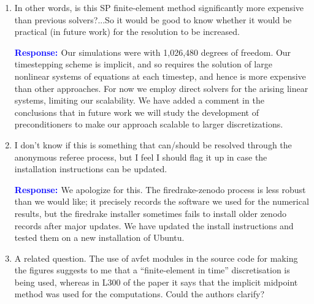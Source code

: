 \documentclass{article}
\theoremstyle{definition}
\newtheorem{remark}{Remark}[section]
\newcommand{\rv}[1]{%
  \colorbox{gray!20}{%
    \parbox{0.96\linewidth}{%
      \small #1
    }%
  }%
}
\newcommand{\rp}{\textbf{\textcolor{blue}{Response: }}}
\newcommand{\blue}[1]{\textcolor{blue}{#1}}
\begin{document}
\begin{enumerate}
\rp Fixed. Thank you so much for pointing this out. If we can choose $\bm A$ with a proper gauge $(\bm A, \bm B_H)=0$, then we can strengthen the inequality as the author pointed out. 

This is equivalent to saying that 
\begin{equation}
    |\Tilde{\mathcal{H}}|\leq C^{-1} \|\bm B_R\|^2
\end{equation}
since $\|\bm B\|^2 = \|\bm B_R\|^2 +\|\bm B_H\|^2$ due to $\bm B_R \perp \bm B_H$. We added the following content after the proof of the generalized Arnold inequality: \blue{
\begin{remark}
    If we choose $\bm A$ so that $(\bm A, \bm B_H)=0$, then we have
    \begin{equation}
        |\tilde{\mathcal{H}}|\leq C^{-1}\|\bm B_R\|^2,
    \end{equation}
    so that the harmonic form does not arise in the generalized Arnold inequality.
\end{remark}
}

\item \rv{In other words, is this SP
finite-element method significantly more expensive than previous solvers?...So it would be good to know whether it would be
practical (in future work) for the resolution to be increased.}

\rp Our simulations were with 1,026,480 degrees of freedom. Our timestepping scheme is implicit, and so requires the solution of large nonlinear systems of equations at each timestep, and hence is more expensive than other approaches. For now we employ direct solvers for the arising linear systems, limiting our scalability. We have added a comment in the conclusions that in future work we will study the development of preconditioners to make our approach scalable to larger discretizations.

\item \rv{I don’t know if this is
something that can/should be resolved through the anonymous referee process, but I feel
I should flag it up in case the installation instructions can be updated.} 

\rp We apologize for this. The firedrake-zenodo process is less robust than we would like; it precisely records the software we used for the numerical results, but the firedrake installer sometimes fails to install older zenodo records after major updates. We have updated the install instructions and tested them on a new installation of Ubuntu. 
\item \rv{A related question. The use of avfet modules in the source code for making the figures
suggests to me that a “finite-element in time” discretisation is being used, whereas in L300
of the paper it says that the implicit midpoint method was used for the computations.
Could the authors clarify?}


\end{enumerate}
\end{document}
